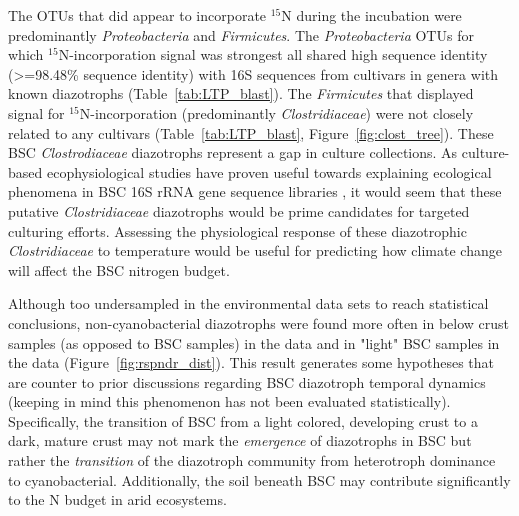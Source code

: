 {The OTUs that did appear to incorporate $^{15}$N during the incubation were
predominantly \textit{Proteobacteria} and \textit{Firmicutes}. The
\textit{Proteobacteria} OTUs for which $^{15}$N-incorporation signal was
strongest all shared high sequence identity (\textgreater=98.48\% sequence
identity) with 16S sequences from cultivars in genera with known diazotrophs
(Table~\ref{tab:LTP_blast}). The \textit{Firmicutes} that displayed signal
for $^{15}$N-incorporation (predominantly \textit{Clostridiaceae}) were not
closely related to any cultivars (Table~\ref{tab:LTP_blast},
Figure~\ref{fig:clost_tree}). These BSC \textit{Clostrodiaceae} diazotrophs
represent a gap in culture collections. As culture-based ecophysiological
studies have proven useful towards explaining ecological phenomena in BSC 16S
rRNA gene sequence libraries \citep{Garcia_Pichel_2013}, it would seem that
these putative \textit{Clostridiaceae} diazotrophs would be prime candidates
for targeted culturing efforts. Assessing the physiological response of these
diazotrophic \textit{Clostridiaceae} to temperature would be useful for
predicting how climate change will affect the BSC nitrogen budget. 

Although too undersampled in the environmental data sets to reach statistical
conclusions, non-cyanobacterial diazotrophs were found more often in below
crust samples (as opposed to BSC samples) in the \citet{Steven_2013} data and
in "light" BSC samples in the \citet{Garcia_Pichel_2013} data
(Figure~\ref{fig:rspndr_dist}). This result generates some hypotheses that
are counter to prior discussions regarding BSC diazotroph temporal dynamics
(keeping in mind this phenomenon has not been evaluated statistically).
Specifically, the transition of BSC from a light colored, developing crust to
a dark, mature crust may not mark the \textit{emergence} of diazotrophs in
BSC but rather the \textit{transition} of the diazotroph community from
heterotroph dominance to cyanobacterial.  Additionally, the soil beneath BSC
may contribute significantly to the N budget in arid ecosystems.

}
